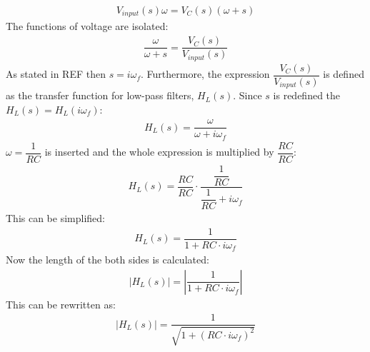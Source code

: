 \begin{align}
V_{input}(s)\omega=V_{C}(s)(\omega+s)
\end{align} 
The functions of voltage are isolated:
\begin{align}
\dfrac{\omega}{\omega+s} = \dfrac{V_{C}(s)}{V_{input}(s)}
\end{align} 
As stated in REF then $s=i \omega_f$. Furthermore, the expression $\dfrac{V_{C}(s)}{V_{input}(s)}$ is defined as the transfer function for low-pass filters, $H_{L}(s)$. Since $s$ is redefined the $H_{L}(s)=H_{L}(i \omega_f)$:
\begin{align}
H_{L}(s) = \dfrac{\omega}{\omega+i \omega_f} 
\end{align}
$\omega = \dfrac{1}{RC}$ is inserted and the whole expression is multiplied by $\dfrac{RC}{RC}$:
\begin{align}
H_{L}(s) = \dfrac{RC}{RC} \cdot \dfrac{\dfrac{1}{RC}}{\dfrac{1}{RC}+i \omega_f} 
\end{align}
This can be simplified:
\begin{align}
H_{L}(s) =  \dfrac{1}{1+RC \cdot i \omega_f} 
\end{align}
Now the length of the both sides is calculated:
\begin{align}
\left|H_{L}(s) \right| =  \left|\dfrac{1}{1+RC \cdot i \omega_f} \right| 
\end{align}
This can be rewritten as:
\begin{align}
\left|H_{L}(s) \right| =  \dfrac{1}{\sqrt{1+(RC \cdot i \omega_f)^2}}
\end{align}
